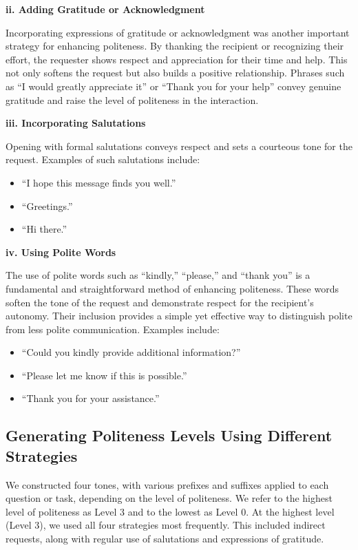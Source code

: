 \documentclass[11pt]{article}
\begin{document}
\textbf{ii. Adding Gratitude or Acknowledgment}

Incorporating expressions of gratitude or acknowledgment was another important strategy for enhancing politeness. By thanking the recipient or recognizing their effort, the requester shows respect and appreciation for their time and help. This not only softens the request but also builds a positive relationship. Phrases such as “I would greatly appreciate it” or “Thank you for your help” convey genuine gratitude and raise the level of politeness in the interaction.

\textbf{iii. Incorporating Salutations}

Opening with formal salutations conveys respect and sets a courteous tone for the request. Examples of such salutations include:  
\begin{itemize}
    \item “I hope this message finds you well.”
    \item “Greetings.”
    \item “Hi there.”
\end{itemize}

\textbf{iv. Using Polite Words}

The use of polite words such as “kindly,” “please,” and “thank you” is a fundamental and straightforward method of enhancing politeness. These words soften the tone of the request and demonstrate respect for the recipient’s autonomy. Their inclusion provides a simple yet effective way to distinguish polite from less polite communication. Examples include:  
\begin{itemize}
    \item “Could you kindly provide additional information?”
    \item “Please let me know if this is possible.”
    \item “Thank you for your assistance.”
\end{itemize}

\subsection{Generating Politeness Levels Using Different Strategies}

We constructed four tones, with various prefixes and suffixes applied to each question or task, depending on the level of politeness. We refer to the highest level of politeness as Level 3 and to the lowest as Level 0. At the highest level (Level 3), we used all four strategies most frequently. This included indirect requests, along with regular use of salutations and expressions of gratitude.  
\end{document}
